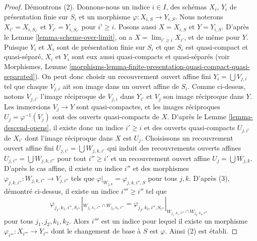 \begin{proof}
\medskip\noindent
Démontrons (2). Donnons-nous un indice $i \in I$, des schémas
$X_i$, $Y_i$ de présentation finie sur $S_i$ et un morphisme
$\varphi : X_{i, S} \to Y_{i, S}$. Nous noterons
$X_{i'} = X_{i, S_{i'}}$ et $Y_{i'} = Y_{i, S_{i'}}$ pour
$i' \geq i$. Posons aussi $X = X_{i, S}$ et $Y = Y_{i, S}$.
D'après le Lemme \ref{lemma-scheme-over-limit}, on a
$X = \lim_{i' \geq i} X_{i'}$, et de même pour $Y$.
Puisque $Y_i$ et $X_i$ sont de présentation finie
sur $S_i$ et que $S_i$ est quasi-compact et quasi-séparé,
$X_i$ et $Y_i$ sont eux aussi quasi-compacts et quasi-séparés
(voir Morphismes,
Lemme \ref{morphisms-lemma-finite-presentation-quasi-compact-quasi-separated}).
On peut donc choisir un recouvrement ouvert affine fini
$Y_i = \bigcup V_{j, i}$ tel que chaque $V_{j, i}$ ait son image dans
un ouvert affine de $S_i$. Comme ci-dessus, notons $V_{j, i'}$ l'image
réciproque de $V_{j, i}$ dans $Y_{i'}$ et $V_j$ son image réciproque dans $Y$.
Les immersions $V_j \to Y$ sont quasi-compactes, et les images réciproques
$U_j = \varphi^{-1}(V_j)$ sont des ouverts quasi-compacts de $X$.
D'après le Lemme \ref{lemma-descend-opens}, il existe donc un indice
$i' \geq i$ et des ouverts quasi-compacts $U_{j, i'}$ de $X_{i'}$
dont l'image réciproque dans $X$ est $U_j$. Choisissons un recouvrement ouvert affine fini
$U_{j, i'} = \bigcup W_{j, k, i'}$ qui induit des recouvrements ouverts affines
$U_{j, i''} = \bigcup W_{j, k, i''}$
pour tout $i'' \geq i'$ et un recouvrement ouvert affine
$U_j = \bigcup W_{j, k}$. D'après le cas affine, il existe
un indice $i''$ et des morphismes
$\varphi_{j, k, i''} : W_{j, k, i''} \to V_{j, i''}$
tels que
$\varphi|_{W_{j, k}} = \varphi_{j, k, i'', S}$ pour tous $j, k$.
D'après (3), démontré ci-dessus, il existe un indice $i''' \geq i''$
tel que
$$
\varphi_{j_1, k_1, i'', S_{i'''}}|_{W_{j_1, k_1, i'''} \cap W_{j_2, k_2, i'''}}
=
\varphi_{j_2, k_2, i'', S_{i'''}}|_{W_{j_1, k_1, i'''} \cap W_{j_2, k_2, i'''}}
$$
pour tous $j_1, j_2, k_1, k_2$. Alors $i'''$ est un indice pour lequel
il existe un morphisme $\varphi_{i'''} : X_{i'''} \to Y_{i'''}$
dont le changement de base à $S$ est $\varphi$. Ainsi (2) est établi.


\end{proof}

